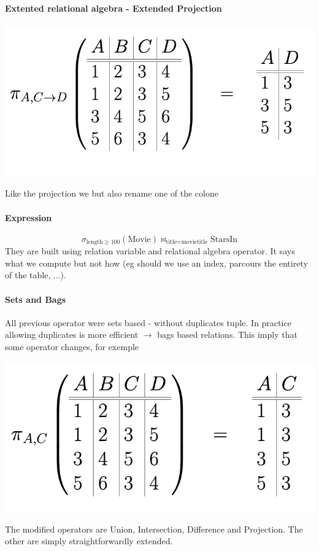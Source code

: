 \documentclass[12pt,a4paper]{article}
\begin{document}
\paragraph{Extented relational algebra - Extended Projection}
\begin{center}
	\includegraphics[scale=0.45]{img/img14.png}
\end{center}
Like the projection we but also rename one of the colone

\paragraph{Expression}
$$\sigma_{\text{length}\geq 100}(\text{Movie}) \Join_{\text{title}=\text{movietitle}} \text{StarsIn} $$
They are built using relation variable and relational algebra operator. It says what we compute but not how (eg should we use an index, parcours the entirety of the table, ...).

\paragraph{Sets and Bags}
All previous operator were sets based - without duplicates tuple. In practice allowing duplicates is more efficient $\rightarrow$ bags based relations. This imply that some operator changes, for exemple
\begin{center}
	\includegraphics[scale=0.45]{img/img15.png}
\end{center}
The modified operators are Union, Intersection, Difference and Projection. The other are simply straightforwardly extended.
\end{document}
